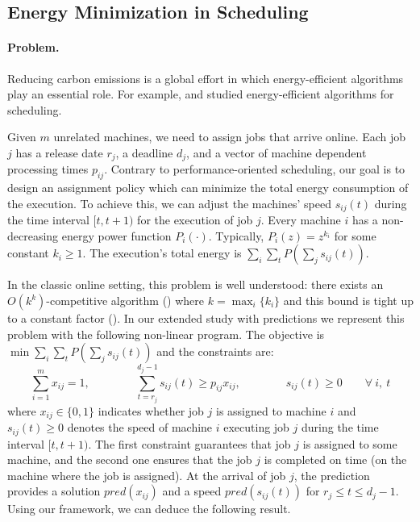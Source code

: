 
\subsection{Energy Minimization in Scheduling}

\paragraph{Problem.}
Reducing carbon emissions is a global effort in which energy-efficient algorithms play an essential role. For example, \cite{Albers10:Energy-efficient-algorithms} and \cite{GuCaiZengZhangJinDai:2019} studied energy-efficient algorithms for scheduling.

Given $m$ unrelated machines, we need to assign jobs that arrive online. Each job $j$ has a release date $r_{j}$, a deadline $d_{j}$, and a vector of machine dependent processing times $p_{ij}$. Contrary to performance-oriented scheduling, our goal is to design an assignment policy which can minimize the total energy consumption of the execution. To achieve this, we can adjust the machines' speed $s_{ij}(t)$ during the time interval $[t,t+1)$ for the execution of job $j$. Every machine $i$ has a non-decreasing energy power function $P_{i}(\cdot)$. Typically, $P_{i}(z) = z^{k_{i}}$ for some constant $k_{i} \geq 1$. The execution's total energy is $\sum_{i} \sum_{t} P(\sum_{j} s_{ij}(t))$.

In the classic online setting, this problem is well understood: there exists an $O(k^{k})$-competitive algorithm (\cite{Thang20:Online-Primal-Dual}) where $k = \max_{i} \{k_{i}\}$
and this bound is tight up to a constant factor (\cite{Caragiannis08:Better-bounds}). In our extended study with predictions we represent this problem with the following non-linear program. The objective is $\min \sum_{i} \sum_{t} P(\sum_{j} s_{ij}(t))$ and the constraints are:
$$
\sum_{i=1}^{m} x_{ij} = 1,  \qquad \qquad \sum_{t = r_{j}}^{d_{j}-1} s_{ij}(t) \geq p_{ij} x_{ij}, \qquad  \qquad s_{ij}(t) \geq 0  \qquad \forall\ i,\ t
$$
where $x_{ij} \in \{0,1\}$ indicates whether job $j$ is assigned to machine $i$
and $s_{ij}(t) \geq 0$ denotes the speed of machine $i$ executing job $j$ during the time interval $[t, t+1)$.
The first constraint guarantees that job $j$ is assigned to some machine, and the second one ensures
that the job $j$ is completed on time (on the machine where the job is assigned). At the arrival of
job $j$, the prediction provides a solution $pred(x_{ij})$ and a speed $pred(s_{ij}(t))$ for $r_{j} \leq t \leq d_{j} - 1$.
Using our framework, we can deduce the following result.

